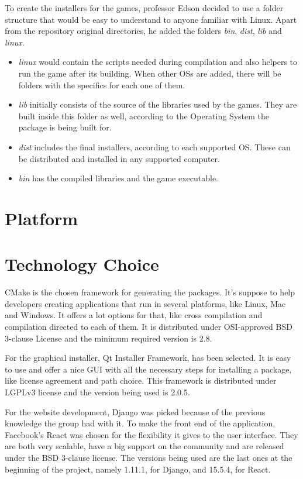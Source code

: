To create the installers for the games, professor Edson decided to use a folder structure that would be easy to understand to anyone familiar with Linux. Apart from the repository original directories, he added the folders \textit{bin}, \textit{dist}, \textit{lib} and \textit{linux}.

\begin{itemize}
\item \textit{linux} would contain the scripts needed during compilation and also helpers to run the game after its building. When other OSs are added, there will be folders with the specifics for each one of them.
\item \textit{lib} initially consists of the source of the libraries used by the games. They are built inside this folder as well, according to the Operating System the package is being built for.
\item \textit{dist} includes the final installers, according to each supported OS. These can be distributed and installed in any supported computer.
\item \textit{bin} has the compiled libraries and the game executable.

\end{itemize}
\section[Platform]{Platform}


\section[Technology Choice]{Technology Choice}

CMake is the chosen framework for generating the packages. It's suppose to help developers creating applications that run in several platforms, like Linux, Mac and Windows. It offers a lot options for that, like cross compilation and compilation directed to each of them. It is distributed under OSI-approved BSD 3-clause License and the minimum required version is 2.8.

For the graphical installer, Qt Installer Framework, has been selected. It is easy to use and offer a nice GUI with all the necessary steps for installing a package, like license agreement and path choice. This framework is distributed under LGPLv3 license and the version being used is 2.0.5.

For the website development, Django was picked because of the previous knowledge the group had with it. To make the front end of the application, Facebook's React was chosen for the flexibility it gives to the user interface. They are both very scalable, have a big support on the community and are released under the BSD 3-clause license. The versions being used are the last ones at the beginning of the project, namely 1.11.1, for Django, and 15.5.4, for React.

